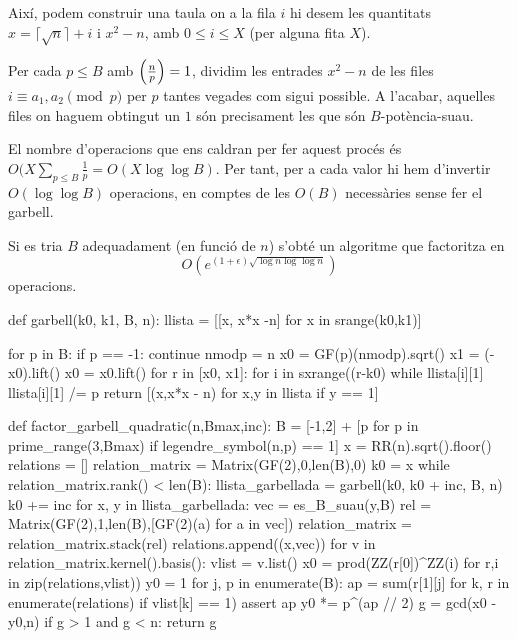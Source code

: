 Així, podem construir una taula on a la fila $i$ hi desem les quantitats $x=\lceil \sqrt{n}\rceil +i$ i $x^2-n$, amb $0\leq i\leq X$ (per alguna fita $X$).

Per cada $p\leq B$ amb $\left(\frac{n}{p}\right)=1$, dividim les entrades $x^2-n$ de les files $i\equiv a_1,a_2\pmod{p}$ per $p$ tantes vegades com sigui possible. A l'acabar, aquelles files on haguem obtingut un $1$ són precisament les que són $B$-potència-suau.

El nombre d'operacions que ens caldran per fer aquest procés és $O(X\sum_{p\leq B} \frac 1p = O(X\log\log B)$. Per tant, per a cada valor hi hem d'invertir $O(\log\log B)$ operacions, en comptes de les $O(B)$ necessàries sense fer el garbell.

\begin{proposition}
Si es tria $B$ adequadament (en funció de $n$) s'obté un algoritme que factoritza en
\[
O\left(e^{(1+\epsilon)\sqrt{\log n\log\log n}}\right)
\]
operacions.
\end{proposition}

\begin{python}
def garbell(k0, k1, B, n):
    llista = [[x, x*x -n] for x in srange(k0,k1)]

    for p in B:
        if p == -1:
            continue
        nmodp = n %
        x0 = GF(p)(nmodp).sqrt()
        x1 = (-x0).lift()
        x0 = x0.lift()
        for r in [x0, x1]:
            for i in sxrange((r-k0) %
                while llista[i][1] %
                    llista[i][1] /= p
    return [(x,x*x - n) for x,y in llista if y == 1]

def factor_garbell_quadratic(n,Bmax,inc):
    B = [-1,2] + [p for p in prime_range(3,Bmax) if legendre_symbol(n,p) == 1]
    x = RR(n).sqrt().floor()
    relations = []
    relation_matrix = Matrix(GF(2),0,len(B),0)
    k0 = x
    while relation_matrix.rank() < len(B):
        llista_garbellada =  garbell(k0, k0 + inc, B, n)
        k0 += inc
        for x, y in llista_garbellada:
            vec = es_B_suau(y,B)
            rel = Matrix(GF(2),1,len(B),[GF(2)(a) for a in vec])
            relation_matrix = relation_matrix.stack(rel)
            relations.append((x,vec))
        for v in relation_matrix.kernel().basis():
            vlist = v.list()
            x0 = prod(ZZ(r[0])^ZZ(i) for r,i in zip(relations,vlist))
            y0 = 1
            for j, p in enumerate(B):
                ap = sum(r[1][j] for k, r in enumerate(relations) if vlist[k] == 1)
                assert ap %
                y0 *= p^(ap // 2)
            g = gcd(x0 - y0,n)
            if g > 1 and g < n:
                return g
\end{python}

